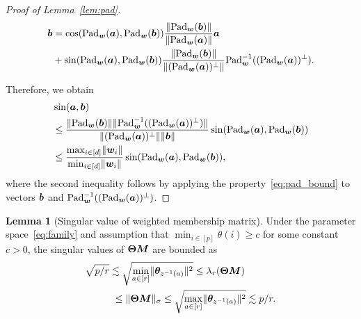\documentclass[journal]{IEEEtran}
\theoremstyle{definition}
\newtheorem{lem}{Lemma}
\theoremstyle{definition}
\begin{document}
\begin{proof}[Proof of Lemma~\ref{lem:pad}]
\vspace{-0.5cm} 
\small
\begin{align}
    \bm{b} &=  \cos(\text{Pad}_{\bm{w}}(\bm{a}), \text{Pad}_{\bm{w}}(\bm{b})) \frac{\lVert\text{Pad}_{\bm{w}}(\bm{b})\rVert}{\lVert\text{Pad}_{\bm{w}}(\bm{a})\rVert} \bm{a} \\
    & +  \sin(\text{Pad}_{\bm{w}}(\bm{a}), \text{Pad}_{\bm{w}}(\bm{b}))\frac{\lVert\text{Pad}_{\bm{w}}(\bm{b})\rVert}{\lVert(\text{Pad}_{\bm{w}}(\bm{a}))^{\perp}\rVert} \text{Pad}_{\bm{w}}^{-1}((\text{Pad}_{\bm{w}}(\bm{a}))^{\perp}).
\end{align}
\normalsize

Therefore, we obtain 
\begin{align}
    &\sin(\bm{a}, \bm{b}) \\
    &\leq \frac{ \lVert\text{Pad}_{\bm{w}}(\bm{b}) \rVert \lVert\text{Pad}_{\bm{w}}^{-1}((\text{Pad}_{\bm{w}}(\bm{a}))^{\perp})  \rVert }{ \lVert(\text{Pad}_{\bm{w}}(\bm{a}))^{\perp} \rVert \lVert\bm{b}\rVert }  \sin(\text{Pad}_{\bm{w}}(\bm{a}), \text{Pad}_{\bm{w}}(\bm{b}))\\
    & \leq \frac{ \max_{i \in [d]} \lVert\bm{w}_i\rVert }{\min_{i \in [d]} \lVert\bm{w}_i\rVert} \sin(\text{Pad}_{\bm{w}}(\bm{a}), \text{Pad}_{\bm{w}}(\bm{b})),
\end{align}
where the second inequality follows by applying the property~\eqref{eq:pad_bound} to vectors $\bm{b}$ and $\text{Pad}_{\bm{w}}^{-1}((\text{Pad}_{\bm{w}}(\bm{a}))^{\perp})$.
\end{proof}

\begin{lem}[Singular value of weighted membership matrix]\label{lem:singular_thetam} Under the parameter space~\eqref{eq:family} and assumption that $\min_{i \in [p]} \theta(i) \geq c$ {for some constant $c >0$}, the singular values of $\boldsymbol{\Theta} \bm M$ are bounded as 
\begin{align}
    \sqrt{p/r} &\lesssim \sqrt{ \min_{a \in [r]}\onormSize{}{ \mtheta_{ z^{-1}(a)} }^2 }  \leq \lambda_{r}(\mTheta \mM) \\
    &\ \leq \onormSize{}{\mTheta \mM}_{\sigma} \leq\sqrt{ \max_{a \in [r]}\onormSize{}{ \mtheta_{ z^{-1}(a)} }^2 } \lesssim  p /r . \label{eq:membership2}
\end{align}
\end{lem}
\end{document}
